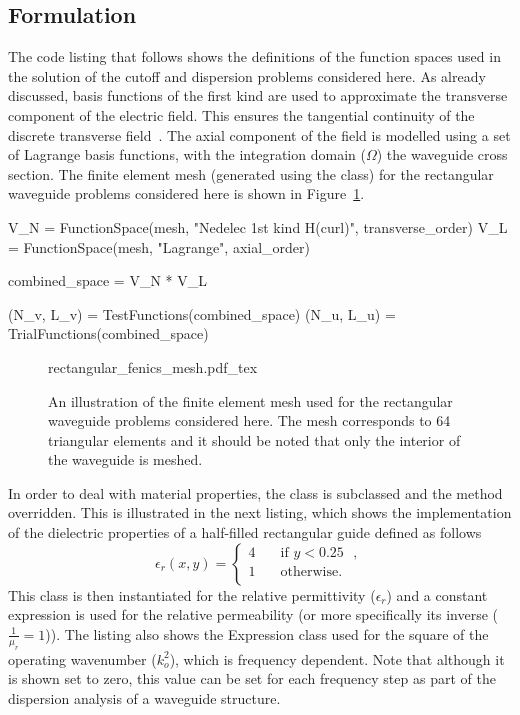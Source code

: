 \subsection{Formulation}

The code listing that follows shows the definitions of the function
spaces used in the solution of the cutoff and dispersion problems
considered here. As already discussed, \nedelec{} basis functions of
the first kind are used to approximate the transverse component of the
electric field. This ensures the tangential continuity of the discrete
transverse field~\citep{Jin2002}.  The axial component of the field is
modelled using a set of Lagrange basis functions, with the integration
domain ($\Omega$) the waveguide cross section. The finite element mesh
(generated using the \dolfin{}  class) for the
rectangular waveguide problems considered here is shown in
Figure~\ref{fig:lezar:rectangular_fenics_mesh}.
\begin{python}
V_N = FunctionSpace(mesh, "Nedelec 1st kind H(curl)", transverse_order)
V_L = FunctionSpace(mesh, "Lagrange", axial_order)

combined_space = V_N * V_L

(N_v, L_v) = TestFunctions(combined_space)
(N_u, L_u) = TrialFunctions(combined_space)
\end{python}

\begin{figure}
  \centering
    \def\svgwidth{\smallfig}
  {rectangular_fenics_mesh.pdf_tex}
  \caption{An illustration of the finite element mesh used for the rectangular waveguide problems considered here. The mesh corresponds to 64 triangular elements and it should be noted that only the interior of the waveguide is meshed.}
  \label{fig:lezar:rectangular_fenics_mesh}
\end{figure}

In order to deal with material properties, the  class
is subclassed and the  method overridden. This is
illustrated in the next listing, which shows the implementation of the
dielectric properties of a half-filled rectangular guide defined as
follows
\begin{equation}
\label{eq:lezar:half_filled_dielectric}
\epsilon_r (x,y) =
\begin{cases}
  4\quad &\text{if $y < 0.25$ },\\
  1\quad &\text{otherwise}.\\
\end{cases}
\end{equation}
This class is then instantiated for the relative permittivity
($\epsilon_r$) and a constant expression is used for the relative
permeability (or more specifically its inverse ($\frac{1}{\mu_r} =
1$)). The listing also shows the Expression class used for the square
of the operating wavenumber ($k_o^2$), which is frequency
dependent. Note that although it is shown set to zero, this value can
be set for each frequency step as part of the dispersion analysis of a
waveguide structure.

